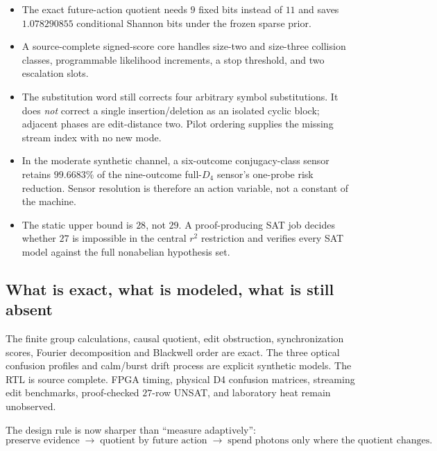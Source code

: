 \begin{itemize}
\item The exact future-action quotient needs $9$ fixed bits instead of $11$ and saves
$1.078290855$ conditional Shannon bits under the frozen sparse prior.
\item A source-complete signed-score core handles size-two and size-three collision
classes, programmable likelihood increments, a stop threshold, and two escalation slots.
\item The substitution word still corrects four arbitrary symbol substitutions.  It does
\emph{not} correct a single insertion/deletion as an isolated cyclic block; adjacent phases
are edit-distance two.  Pilot ordering supplies the missing stream index with no new mode.
\item In the moderate synthetic channel, a six-outcome conjugacy-class sensor retains
$99.6683\%$ of the nine-outcome full-$D_4$ sensor's one-probe risk reduction.  Sensor
resolution is therefore an action variable, not a constant of the machine.
\item The static upper bound is $28$, not $29$.  A proof-producing SAT job decides whether
$27$ is impossible in the central $r^2$ restriction and verifies every SAT model against
the full nonabelian hypothesis set.
\end{itemize}

\subsection*{What is exact, what is modeled, what is still absent}

The finite group calculations, causal quotient, edit obstruction, synchronization scores,
Fourier decomposition and Blackwell order are exact.  The three optical confusion
profiles and calm/burst drift process are explicit synthetic models.  The RTL is source
complete.  FPGA timing, physical D4 confusion matrices, streaming edit benchmarks,
proof-checked $27$-row UNSAT, and laboratory heat remain unobserved.

The design rule is now sharper than ``measure adaptively'':
\[
\boxed{\text{preserve evidence}\;\longrightarrow\;\text{quotient by future action}
\;\longrightarrow\;\text{spend photons only where the quotient changes}.}
\]
